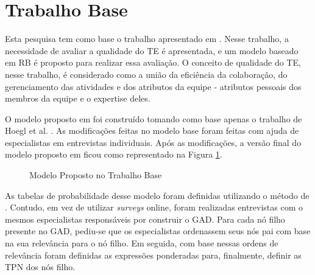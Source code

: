 \section{Trabalho Base}
\label{trabalhos:base}

Esta pesquisa tem como base o trabalho apresentado em \cite{freire}. Nesse trabalho, a necessidade de avaliar a qualidade do TE é apresentada, e um modelo baseado em RB é proposto para realizar essa avaliação. O conceito de qualidade do TE, nesse trabalho, é considerado como a união da eficiência da colaboração, do gerenciamento das atividades e dos atributos da equipe - atributos pessoais dos membros da equipe e o expertise deles.

O modelo proposto em \cite{freire} foi construído tomando como base apenas o trabalho de Hoegl et al. \cite{hoegl}. As modificações feitas no modelo base foram feitas com ajuda de especialistas em entrevistas individuais. Após as modificações, a versão final do modelo proposto em \cite{freire} ficou como representado na Figura \ref{trabalho:base:modelo}.

\begin{figure}[ht!]
\begin{center}
    \end{center}
    \caption{Modelo Proposto no Trabalho Base}
    \label{trabalho:base:modelo}
\end{figure}

As tabelas de probabilidade desse modelo foram definidas utilizando o método de \cite{perkusichNPT}. Contudo, em vez de utilizar \textit{surveys} online, foram realizadas entrevistas com o mesmos especialistas responsáveis por construir o GAD. Para cada nó filho presente no GAD, pediu-se que os especialistas ordenassem seus nós pai com base na sua relevância para o nó filho. Em seguida, com base nessas ordens de relevância foram definidas as expressões ponderadas para, finalmente, definir as TPN dos nós filho.

